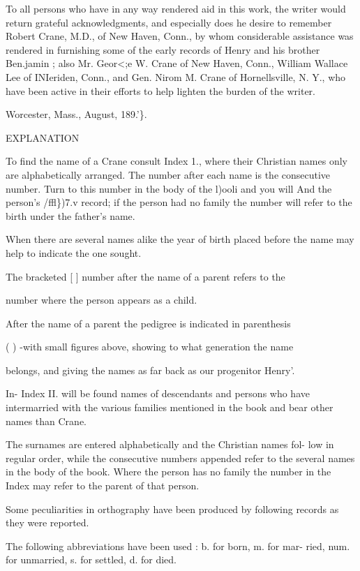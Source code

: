 \documentclass{book}
\begin{document}
To all persons who have in any way rendered aid in this work, 
the writer would return grateful acknowledgments, and especially 
does he desire to remember Robert Crane, M.D., of New 
Haven, Conn., by whom considerable assistance was rendered in 
furnishing some of the early records of Henry and his brother 
Ben.jamin ; also Mr. Geor<;e W. Crane of New Haven, Conn., 
William Wallace Lee of INIeriden, Conn., and Gen. Nirom M. 
Crane of Hornellsville, N. Y., who have been active in their 
efforts to help lighten the burden of the writer. 


Worcester, Mass., August, 189.'\}. 



EXPLANATION 



To find the name of a Crane consult Index 1., where their Christian 
names only are alphabetically arranged. The number after each name 
is the consecutive number. Turn to this number in the body of the 
l)ooli and you will And the person's /ffl\})7.v record; if the person had no 
family the number will refer to the birth under the father's name. 

When there are several names alike the year of birth placed before the 
name may help to indicate the one sought. 

The bracketed [ ] number after the name of a parent refers to the 

number where the person appears as a child. 

After the name of a parent the pedigree is indicated in parenthesis 

( ) -with small figures above, showing to what generation the name 

belongs, and giving the names as far back as our progenitor Henry'. 

In- Index II. will be found names of descendants and persons who 
have intermarried with the various families mentioned in the book and 
bear other names than Crane. 

The surnames are entered alphabetically and the Christian names fol- 
low in regular order, while the consecutive numbers appended refer to 
the several names in the body of the book. Where the person has no 
family the number in the Index may refer to the parent of that person. 

Some peculiarities in orthography have been produced by following 
records as they were reported. 

The following abbreviations have been used : b. for born, m. for mar- 
ried, num. for unmarried, s. for settled, d. for died. 
\end{document}
